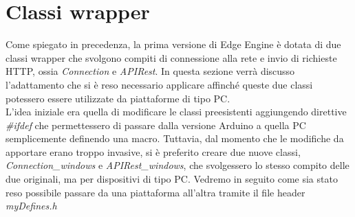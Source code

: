 \section{Classi wrapper}
Come spiegato in precedenza, la prima versione di Edge Engine è dotata di due classi wrapper che svolgono compiti di connessione alla rete e invio di richieste HTTP, ossia \textit{Connection} e \textit{APIRest}. In questa sezione verrà discusso l’adattamento che si è reso necessario applicare affinché queste due classi potessero essere utilizzate da piattaforme di tipo PC.\\
L’idea iniziale era quella di modificare le classi preesistenti aggiungendo direttive \textit{\#ifdef} che permettessero di passare dalla versione Arduino a quella PC semplicemente definendo una macro. Tuttavia, dal momento che le modifiche da apportare erano troppo invasive, si è preferito creare due nuove classi, \textit{Connection\_windows} e \textit{APIRest\_windows}, che svolgessero lo stesso compito delle due originali, ma per dispositivi di tipo PC. Vedremo in seguito come sia stato reso possibile passare da una piattaforma all'altra tramite il file header \textit{myDefines.h} 
